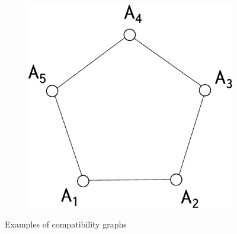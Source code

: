 \documentclass[a4paper]{article}
\theoremstyle{definition}
\begin{document}
\begin{figure}[h]
\begin{subfigure}{.3\textwidth}
        \caption{}
        \label{fig:jointprob_CHSH}
    \end{subfigure}
    \begin{subfigure}{.3\textwidth}
        \center
        \includegraphics[width=\textwidth]{KCBS_obs.pdf}
        \caption{}
        \label{fig:jointprob_KCBS}
    \end{subfigure}
    \caption{Examples of compatibility graphs}
    \label{fig:jointprob_graphs}
\end{figure}
\end{document}
